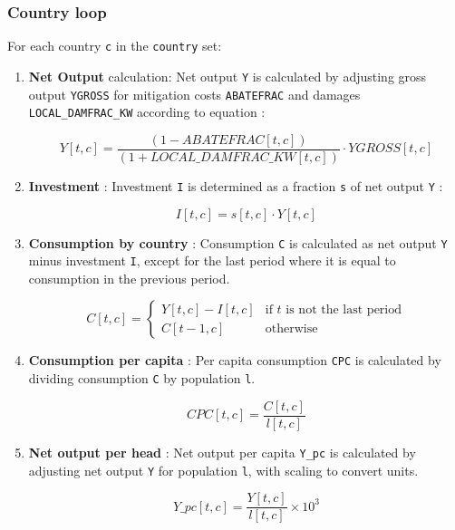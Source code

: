 \documentclass[
]{article}
\begin{document}
\subsubsection{Country loop}\label{country-loop}

For each country \texttt{c} in the \texttt{country} set:

\begin{enumerate}
\def\labelenumi{\arabic{enumi}.}
\item
  \textbf{Net Output} calculation: Net output \texttt{Y} is calculated
  by adjusting gross output \texttt{YGROSS} for mitigation costs
  \texttt{ABATEFRAC} and damages \texttt{LOCAL\_DAMFRAC\_KW} according
  to equation :

  \begin{equation}
 Y[t,c] = \frac{(1 - ABATEFRAC[t,c])}{(1 + LOCAL\_DAMFRAC\_KW[t,c])} \cdot YGROSS[t,c] 
\end{equation}

\item
  \textbf{Investment} : Investment \texttt{I} is determined as a
  fraction \texttt{s} of net output \texttt{Y} :

  \begin{equation}
 I[t,c] = s[t,c] \cdot Y[t,c] 
\end{equation}

\item
  \textbf{Consumption by country} : Consumption \texttt{C} is calculated
  as net output \texttt{Y} minus investment \texttt{I}, except for the
  last period where it is equal to consumption in the previous period.

  \begin{equation}
 C[t,c] =
  \begin{cases}
  Y[t,c] - I[t,c] & \text{if } t \text{ is not the last period} \\
  C[t-1, c] & \text{otherwise}
  \end{cases}
  \end{equation}

\item
  \textbf{Consumption per capita} : Per capita consumption \texttt{CPC}
  is calculated by dividing consumption \texttt{C} by population
  \texttt{l}.

  \begin{equation}
 CPC[t,c] = \frac{C[t,c]}{l[t,c]}
\end{equation}

\item
  \textbf{Net output per head} : Net output per capita \texttt{Y\_pc} is
  calculated by adjusting net output \texttt{Y} for population
  \texttt{l}, with scaling to convert units.

  \begin{equation}
 Y\_pc[t,c] = \frac{Y[t,c]}{l[t,c]} \times 10^3
\end{equation}

\end{enumerate}
\end{document}
